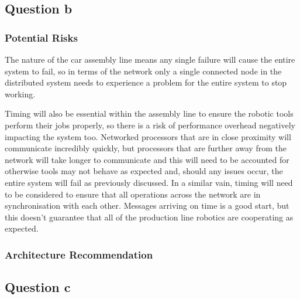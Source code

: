 \documentclass[]{report}
\begin{document}
			\subsection{Question b}
				\subsubsection{Potential Risks}
				The nature of the car assembly line means any single failure will cause the entire system to fail, so in terms of the network only a single connected node in the distributed system needs to experience a problem for the entire system to stop working. 
				
				Timing will also be essential within the assembly line to ensure the robotic tools perform their jobs properly, so there is a risk of performance overhead negatively impacting the system too. Networked processors that are in close proximity will communicate incredibly quickly, but processors that are further away from the network will take longer to communicate and this will need to be accounted for otherwise tools may not behave as expected and, should any issues occur, the entire system will fail as previously discussed. In a similar vain, timing will need to be considered to ensure that all operations across the network are in synchronisation with each other. Messages arriving on time is a good start, but this doesn't guarantee that all of the production line robotics are cooperating as expected.
				
				\subsubsection{Architecture Recommendation}
				
				
			
			
			\subsection{Question c}


	
	
\end{document}
